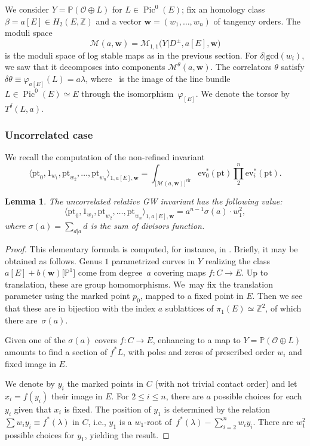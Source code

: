 \documentclass[pdftex]{sigma}
\newcommand{\vir}[1]{\big[#1\big]^\mathrm{vir}}
\newcommand{\ev}{\mathrm{ev}}
\newcommand{\pt}{\mathrm{pt}}
\newcommand{\Pic}{\operatorname{Pic}}
\newcommand{\PP}{\mathbb{P}}
\newcommand{\ZZ}{\mathbb{Z}}
\newcommand{\bfw}{ {\boldsymbol w} }
\newcommand{\M}{\mathcal{M}}
\renewcommand{\O}{\mathcal{O}}
\numberwithin{equation}{section}
\newtheorem{lem}[theo]{Lemma}
\theoremstyle{definition}
\begin{document}
We consider $Y=\PP(\O\oplus L)$ for $L\in\Pic^0(E)$; fix an homology class $\beta=a[E]\in H_2(E,\ZZ)$ and a vector $\bfw=(w_1,\dots,w_n)$ of tangency orders. The moduli space
\[ \M(a,\bfw)=\M_{1,1}\bigl(Y|D^\pm,a[E],\bfw\bigr) \]
is the moduli space of log stable maps as in the previous section.
For $\delta|\mathrm{gcd}(w_i)$, we saw that it decomposes into components $\M^\theta(a,\bfw)$.
The correlators $\theta$ satisfy
$
\delta\theta\equiv \varphi_{a[E]}(L)=a\lambda$,
where~ is the image of the line bundle $L\in\Pic^0(E)\simeq E$ through the isomorphism~$\varphi_{[E]}$. We denote the torsor by $T^\delta(L,a)$.

\subsubsection{Uncorrelated case} We recall the computation of the non-refined invariant
\[ \langle \pt_0,1_{w_1},\pt_{w_2},\dots,\pt_{w_n}\rangle_{1,a[E],\bfw}=
\int_{\vir{\M(a,\bfw)}}\ev_0^*(\pt)\prod_2^n\ev_i^*(\pt). \]

\begin{lem}\label{lem-non-refined-computation}
The uncorrelated relative GW invariant has the following value:
\[ \langle \pt_0,1_{w_1},\pt_{w_2},\dots,\pt_{w_n}\rangle_{1,a[E],\bfw}=a^{n-1}\sigma(a)\cdot w_1^2, \]
where $\sigma(a)=\sum_{d|a}d$ is the sum of divisors function.
\end{lem}

\begin{proof}
This elementary formula is computed, for instance, in \cite{blomme2022floor}. Briefly, it may be obtained as follows. Genus $1$ parametrized curves in $Y$ realizing the class $a[E]+b(\bfw)\big[\PP^1\big]$ come from degree~$a$ covering maps $f\colon C\to E$. Up to translation, these are group homomorphisms. We~may fix the translation parameter using the marked point $p_0$, mapped to a fixed point in $E$.
Then we see that these are in bijection with the index $a$ sublattices of $\pi_1(E)\simeq\ZZ^2$, of which there are~$\sigma(a)$.

 Given one of the $\sigma(a)$ covers $f\colon C\to E$, enhancing to a map to $Y=\PP(\O\oplus L)$ amounts to find a section of $f^*L$, with poles and zeros of prescribed order $w_i$ and fixed image in $E$.

We denote by $y_i$ the %
marked points in $C$ (with not trivial contact order) and let $x_i=f(y_i)$ their image in $E$. For $2\leqslant i\leqslant n$, there are $a$ possible choices for each $y_i$ given that $x_i$ is fixed. The position of $y_1$ is determined by the relation $\sum w_iy_i\equiv f^*(\lambda)$ in $C$, i.e., $y_1$ is a $w_1$-root of~${f^*(\lambda)-\sum_{i=2}^nw_iy_i}$.
There are $w_1^2$ possible choices for $y_1$, yielding the result.
\end{proof}
\end{document}

